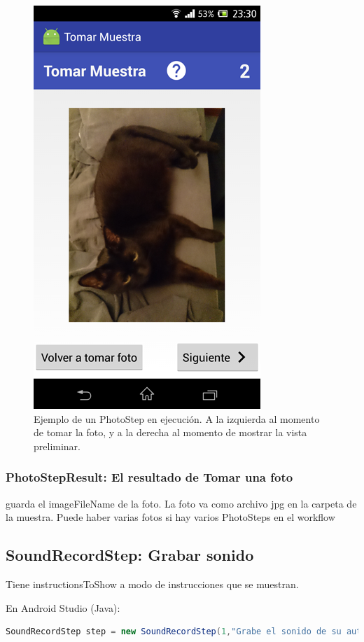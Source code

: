 \begin{figure}[H]
    \includegraphics[scale=0.4]{05-implementacion/PhotoStep2.png}     
   \caption{Ejemplo de un PhotoStep en ejecución. A la izquierda al momento de tomar la foto, y a la derecha al momento de mostrar la vista preliminar.}
   \label{fig:imgPhotoStep}
\end{figure}

\subsubsection{PhotoStepResult: El resultado de Tomar una foto}
guarda el imageFileName de la foto. 
La foto va como archivo jpg en la carpeta de la muestra.
Puede haber varias fotos si hay varios PhotoSteps en el workflow

\subsection{SoundRecordStep: Grabar sonido}
Tiene instructionsToShow a modo de instrucciones que se muestran.

En Android Studio (Java):
\begin{lstlisting}[language=Java, frame=tlb]	
SoundRecordStep step = new SoundRecordStep(1,"Grabe el sonido de su auto",2); 
\end{lstlisting}

